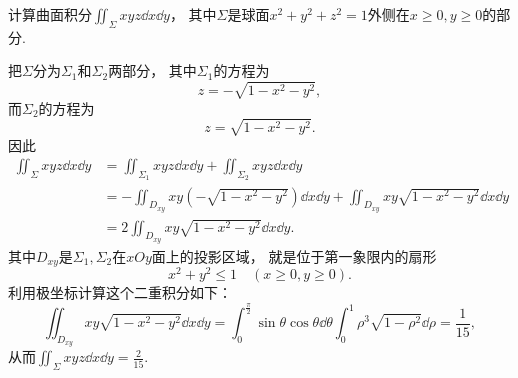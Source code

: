 \begin{example}
计算曲面积分\(\iint_\Sigma xyz \dd{x}\dd{y}\)，
其中\(\Sigma\)是球面\(x^2+y^2+z^2=1\)外侧在\(x\geq0,y\geq0\)的部分.
\begin{solution}
把\(\Sigma\)分为\(\Sigma_1\)和\(\Sigma_2\)两部分，
其中\(\Sigma_1\)的方程为\[
	z = -\sqrt{1-x^2-y^2},
\]
而\(\Sigma_2\)的方程为\[
	z = \sqrt{1-x^2-y^2}.
\]
因此\begin{align*}
	\iint_\Sigma xyz \dd{x}\dd{y}
	&= \iint_{\Sigma_1} xyz \dd{x}\dd{y}
	+ \iint_{\Sigma_2} xyz \dd{x}\dd{y} \\
	&= -\iint_{D_{xy}} xy (-\sqrt{1-x^2-y^2}) \dd{x}\dd{y}
	+ \iint_{D_{xy}} xy \sqrt{1-x^2-y^2} \dd{x}\dd{y} \\
	&= 2 \iint_{D_{xy}} xy \sqrt{1-x^2-y^2} \dd{x}\dd{y}.
\end{align*}
其中\(D_{xy}\)是\(\Sigma_1,\Sigma_2\)在\(xOy\)面上的投影区域，
就是位于第一象限内的扇形\[
	x^2+y^2\leq1 \quad(x\geq0,y\geq0).
\]
利用极坐标计算这个二重积分如下：\[
	\iint_{D_{xy}} xy \sqrt{1-x^2-y^2} \dd{x}\dd{y}
	= \int_0^{\frac\pi2} \sin\theta \cos\theta \dd{\theta}
		\int_0^1 \rho^3 \sqrt{1-\rho^2} \dd{\rho}
	= \frac{1}{15},
\]
从而\(\iint_\Sigma xyz \dd{x}\dd{y} = \frac{2}{15}\).
\end{solution}
\end{example}

